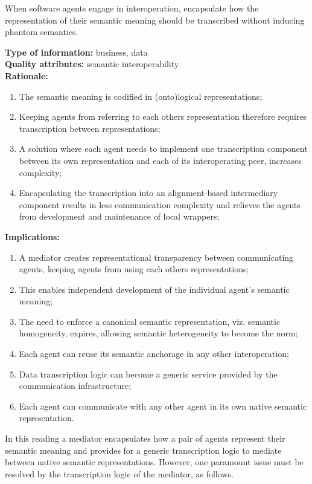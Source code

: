 \documentclass[sort&compress,preprint,authoryear,3p,twocolumn]{elsarticle}
\begin{document}
\begin{mmdp}\label{dp:mediation}

When software agents engage in interoperation, encapsulate how the representation of their semantic meaning should be transcribed without inducing phantom semantics.   

\textbf{Type of information:} business, data  \\
\textbf{Quality attributes:} semantic interoperability   \\
\textbf{Rationale:}
\begin{enumerate}
  \item The semantic meaning is codified in (onto)logical representations;
  \item Keeping agents from referring to each others representation therefore requires transcription between representations;
  \item A solution where each agent needs to implement one transcription component between its own representation and each of its interoperating peer, increases complexity;
  \item Encapsulating the transcription into an alignment-based intermediary component results in less communication complexity and relieves the agents from development and maintenance of local wrappers;
\end{enumerate}
\textbf{Implications:}
\begin{enumerate}
  \item A mediator creates representational transparency between communicating agents, keeping agents from using each others representations;
  \item This enables independent development of the individual agent’s semantic meaning;
  \item The need to enforce a canonical semantic representation, viz. semantic homogeneity, expires, allowing semantic heterogeneity to become the norm;
  \item Each agent can reuse its semantic anchorage in any other interoperation;
  \item Data transcription logic can become a generic service provided by the communication infrastructure;
  \item Each agent can communicate with any other agent in its own native semantic representation.
\end{enumerate}  
\end{mmdp}

In this reading a mediator encapsulates how a pair of agents represent
their semantic meaning and provides for a generic transcription logic to
mediate between native semantic representations. However, one paramount
issue must be resolved by the transcription logic of the mediator, as
follows.
\end{document}
